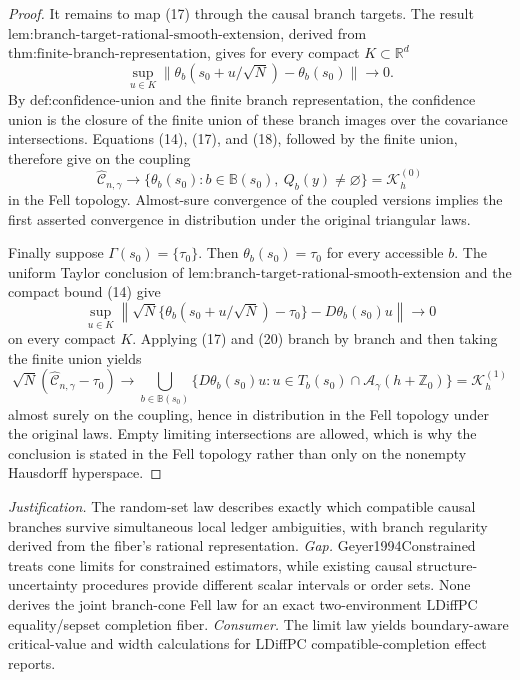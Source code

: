 \documentclass{article}
\begin{document}
\begin{proof}
It remains to map (17) through the causal branch targets. The result \(\text{lem:branch-target-rational-smooth-extension}\), derived from \(\text{thm:finite-branch-representation}\), gives for every compact \(K\subset\mathbb R^d\)
\[
 \sup_{u\in K}
 \|\theta_b(s_0+u/\sqrt N)-\theta_b(s_0)\|
 \longrightarrow0.
 \tag{18}
\]
By \(\text{def:confidence-union}\) and the finite branch representation, the confidence union is the closure of the finite union of these branch images over the covariance intersections. Equations (14), (17), and (18), followed by the finite union, therefore give on the coupling
\[
 \widehat{\mathcal C}_{n,\gamma}\longrightarrow
 \{\theta_b(s_0):b\in\mathbb B(s_0),\ Q_b(y)\ne\varnothing\}
 =\mathcal K_h^{(0)}
 \tag{19}
\]
in the Fell topology. Almost-sure convergence of the coupled versions implies the first asserted convergence in distribution under the original triangular laws.

Finally suppose \(\Gamma(s_0)=\{\tau_0\}\). Then \(\theta_b(s_0)=\tau_0\) for every accessible \(b\). The uniform Taylor conclusion of \(\text{lem:branch-target-rational-smooth-extension}\) and the compact bound (14) give
\[
 \sup_{u\in K}
 \left\|
 \sqrt N\{\theta_b(s_0+u/\sqrt N)-\tau_0\}
 -D\theta_b(s_0)u
 \right\|\longrightarrow0
 \tag{20}
\]
on every compact \(K\). Applying (17) and (20) branch by branch and then taking the finite union yields
\[
 \sqrt N(\widehat{\mathcal C}_{n,\gamma}-\tau_0)
 \longrightarrow
 \bigcup_{b\in\mathbb B(s_0)}
 \{D\theta_b(s_0)u:u\in T_b(s_0)\cap
 \mathcal A_\gamma(h+\mathbb Z_0)\}
 =\mathcal K_h^{(1)}
 \tag{21}
\]
almost surely on the coupling, hence in distribution in the Fell topology under the original laws. Empty limiting intersections are allowed, which is why the conclusion is stated in the Fell topology rather than only on the nonempty Hausdorff hyperspace.
\end{proof}
\par\smallskip\noindent \textit{Justification.} The random-set law describes exactly which compatible causal branches survive simultaneous local ledger ambiguities, with branch regularity derived from the fiber's rational representation. \textit{Gap.} Geyer1994Constrained treats cone limits for constrained estimators, while existing causal structure-uncertainty procedures provide different scalar intervals or order sets. None derives the joint branch-cone Fell law for an exact two-environment LDiffPC equality/sepset completion fiber. \textit{Consumer.} The limit law yields boundary-aware critical-value and width calculations for LDiffPC compatible-completion effect reports.
\end{document}
